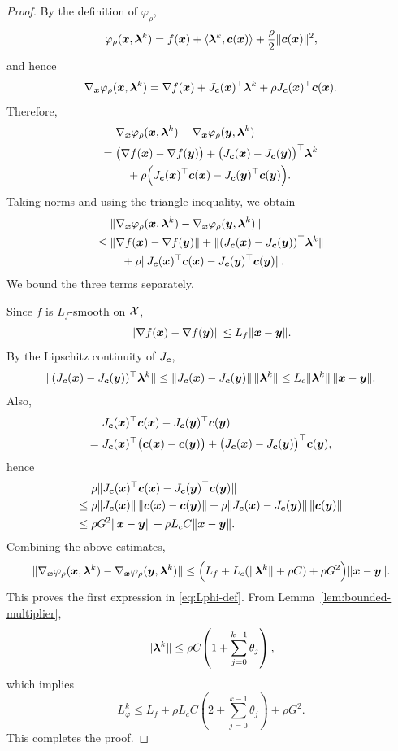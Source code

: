 \documentclass[10pt]{article}
\begin{document}
\begin{proof}
By the definition of $\varphi_\rho$,
\[
\varphi_\rho(\bm{x},\bm{\lambda}^k)
= f(\bm{x}) + \langle \bm{\lambda}^k,\bm{c}(\bm{x})\rangle + \frac{\rho}{2}\|\bm{c}(\bm{x})\|^2,
\]
and hence
\[
\nabla_{\bm{x}}\varphi_\rho(\bm{x},\bm{\lambda}^k)
= \nabla f(\bm{x}) + J_{\bm{c}}(\bm{x})^\top \bm{\lambda}^k
+ \rho J_{\bm{c}}(\bm{x})^\top\bm{c}(\bm{x}).
\]
Therefore,
\begin{align*}
&\nabla_{\bm{x}}\varphi_\rho(\bm{x},\bm{\lambda}^k)
 - \nabla_{\bm{x}}\varphi_\rho(\bm{y},\bm{\lambda}^k) \\
=\;& \bigl(\nabla f(\bm{x})-\nabla f(\bm{y})\bigr)
+ \bigl(J_{\bm{c}}(\bm{x})-J_{\bm{c}}(\bm{y})\bigr)^\top \bm{\lambda}^k \\
&\quad + \rho\Bigl(J_{\bm{c}}(\bm{x})^\top\bm{c}(\bm{x})-J_{\bm{c}}(\bm{y})^\top\bm{c}(\bm{y})\Bigr).
\end{align*}
Taking norms and using the triangle inequality, we obtain
\begin{align*}
&\|\nabla_{\bm{x}}\varphi_\rho(\bm{x},\bm{\lambda}^k)
 - \nabla_{\bm{x}}\varphi_\rho(\bm{y},\bm{\lambda}^k)\| \\
\leq\;& \|\nabla f(\bm{x})-\nabla f(\bm{y})\|
+ \|(J_{\bm{c}}(\bm{x})-J_{\bm{c}}(\bm{y}))^\top \bm{\lambda}^k\| \\
&\quad + \rho\|J_{\bm{c}}(\bm{x})^\top\bm{c}(\bm{x})-J_{\bm{c}}(\bm{y})^\top\bm{c}(\bm{y})\|.
\end{align*}
We bound the three terms separately.

Since $f$ is $L_f$-smooth on $\mathcal{X}$,
\[
\|\nabla f(\bm{x})-\nabla f(\bm{y})\| \leq L_f\|\bm{x}-\bm{y}\|.
\]
By the Lipschitz continuity of $J_{\bm{c}}$,
\[
\|(J_{\bm{c}}(\bm{x})-J_{\bm{c}}(\bm{y}))^\top \bm{\lambda}^k\|
\leq \|J_{\bm{c}}(\bm{x})-J_{\bm{c}}(\bm{y})\|\,\|\bm{\lambda}^k\|
\leq L_c\|\bm{\lambda}^k\|\,\|\bm{x}-\bm{y}\|.
\]
Also,
\begin{align*}
&J_{\bm{c}}(\bm{x})^\top\bm{c}(\bm{x})-J_{\bm{c}}(\bm{y})^\top\bm{c}(\bm{y}) \\
=\;& J_{\bm{c}}(\bm{x})^\top\bigl(\bm{c}(\bm{x})-\bm{c}(\bm{y})\bigr)
+ \bigl(J_{\bm{c}}(\bm{x})-J_{\bm{c}}(\bm{y})\bigr)^\top \bm{c}(\bm{y}),
\end{align*}
hence
\begin{align*}
&\rho\|J_{\bm{c}}(\bm{x})^\top\bm{c}(\bm{x})-J_{\bm{c}}(\bm{y})^\top\bm{c}(\bm{y})\| \\
\leq\;& \rho\|J_{\bm{c}}(\bm{x})\|\,\|\bm{c}(\bm{x})-\bm{c}(\bm{y})\|
+ \rho\|J_{\bm{c}}(\bm{x})-J_{\bm{c}}(\bm{y})\|\,\|\bm{c}(\bm{y})\| \\
\leq\;& \rho G^2\|\bm{x}-\bm{y}\| + \rho L_c C\|\bm{x}-\bm{y}\|.
\end{align*}
Combining the above estimates,
\[
\|\nabla_{\bm{x}}\varphi_\rho(\bm{x},\bm{\lambda}^k)
 - \nabla_{\bm{x}}\varphi_\rho(\bm{y},\bm{\lambda}^k)\|
\leq \Bigl(L_f + L_c(\|\bm{\lambda}^k\|+\rho C) + \rho G^2\Bigr)\|\bm{x}-\bm{y}\|.
\]
This proves the first expression in \eqref{eq:Lphi-def}. From
Lemma~\ref{lem:bounded-multiplier},
\[
\|\bm{\lambda}^k\|
\leq \rho C\!\left(1+\sum_{j=0}^{k-1}\theta_j\right),
\]
which implies
\[
L_{\varphi}^k
\leq L_f + \rho L_c C\!\left(2+\sum_{j=0}^{k-1}\theta_j\right) + \rho G^2.
\]
This completes the proof.  \eproof
\end{proof}
\end{document}

